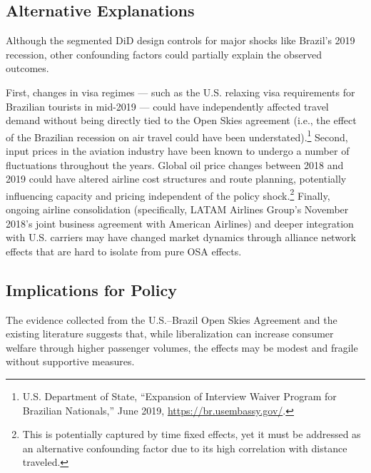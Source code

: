 \documentclass[12pt]{article}
\begin{document}
\subsection{Alternative Explanations}

Although the segmented DiD design controls for major shocks like Brazil’s 2019 recession, other confounding factors could partially explain the observed outcomes. 

First, changes in visa regimes — such as the U.S. relaxing visa requirements for Brazilian tourists in mid-2019 — could have independently affected travel demand without being directly tied to the Open Skies agreement (i.e., the effect of the Brazilian recession on air travel could have been understated).\footnote{U.S. Department of State, “Expansion of Interview Waiver Program for Brazilian Nationals,” June 2019, \url{https://br.usembassy.gov/}.} Second, input prices in the aviation industry have been known to undergo a number of fluctuations throughout the years. Global oil price changes between 2018 and 2019 could have altered airline cost structures and route planning, potentially influencing capacity and pricing independent of the policy shock.\footnote{This is potentially captured by time fixed effects, yet it must be addressed as an alternative confounding factor due to its high correlation with distance traveled.} Finally, ongoing airline consolidation (specifically, LATAM Airlines Group's November 2018's joint business agreement with American Airlines) and deeper integration with U.S. carriers may have changed market dynamics through alliance network effects that are hard to isolate from pure OSA effects.

\subsection{Implications for Policy}

The evidence collected from the U.S.–Brazil Open Skies Agreement and the existing literature suggests that, while liberalization can increase consumer welfare through higher passenger volumes, the effects may be modest and fragile without supportive measures.
\end{document}
